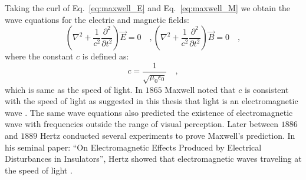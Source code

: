 Taking the curl of Eq.~\eqref{eq:maxwell_E} and Eq.~\eqref{eq:maxwell_M} we obtain the wave equations for the electric and magnetic fields:
\begin{subequations}
\begin{equation}
\label{eq:waveeq_E}
\left( \nabla ^2 + \frac{1}{c^2}\frac{\partial ^2}{\partial t^2}\right)\vec{E} = 0 \quad ,
\end{equation}
\begin{equation}
\label{eq:waveeq_B}
\left( \nabla ^2 + \frac{1}{c^2}\frac{\partial ^2}{\partial t^2}\right)\vec{B} = 0 \quad ,
\end{equation}
\end{subequations}
where the constant $c$ is defined as:
\begin{equation}
\label{eq:speed_of_light}
c = \frac{1}{\sqrt{\mu _0 \epsilon _0}} \quad ,
\end{equation}
which is same as the speed of light. In $\mathrm{1865}$ Maxwell noted that $c$ is consistent with the speed of light as suggested in this thesis that light is an electromagnetic wave \cite{ClerkMaxwell_1865}. The same wave equations also predicted the existence of electromagnetic wave with frequencies outside the range of visual perception. Later between $1886$ and $1889$ Hertz conducted several experiments to prove Maxwell's prediction. In his seminal paper: ``On Electromagnetic Effects Produced by Electrical Disturbances in Insulators'', Hertz showed that electromagnetic waves traveling at the speed of light \cite{dagostino1975}.

